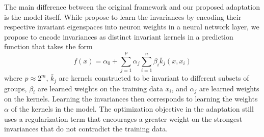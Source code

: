 The main difference between the original framework and our proposed adaptation is the model itself. While \textcite{Mouli:2021} propose to learn the invariances by encoding their respective invariant eigenspaces into neuron weights in a neural network layer, we propose to encode invariances as distinct invariant kernels in a prediction function that takes the form
\[
f(x) = \alpha_0 + \sum_{j=1}^p\alpha_j\sum_{i=1}^n\beta_i\bar{k}_j(x,x_i)
\]
where $p\approx 2^m$, $\bar{k}_j$ are kernels constructed to be invariant to different subsets of groups, $\beta_i$ are learned weights on the training data $x_i$, and $\alpha_j$ are learned weights on the kernels. Learning the invariances then corresponds to learning the weights $\alpha$ of the kernels in the model. The optimization objective in the adaptation still uses a regularization term that encourages a greater weight on the strongest invariances that do not contradict the training data.
\\

